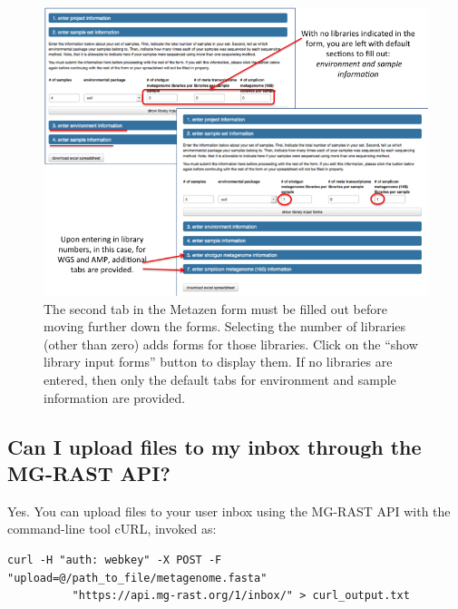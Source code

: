\documentclass[12pt,fullpage]{report}
\begin{document}
\begin{figure}
\begin{center}
\includegraphics[width=6in]{Images/metazen_step2.png}
\end{center}
\caption{The second tab in the Metazen form must be filled out before moving further down the forms. Selecting the number of libraries (other than zero) adds forms for those libraries. Click on the “show library input forms” button to display them. If no libraries are entered, then only the default tabs for environment and sample information are provided.}
\label{fig:metazen_step2}
\end{figure}



\subsection*{Can I upload files to my inbox through the MG-RAST API?}
Yes.  You can upload files to your user inbox using the MG-RAST API with the command-line tool cURL, invoked as:

\begin{small}
\begin{verbatim}
curl -H "auth: webkey" -X POST -F "upload=@/path_to_file/metagenome.fasta"
          "https://api.mg-rast.org/1/inbox/" > curl_output.txt
\end{verbatim}
\end{small}
\end{document}
